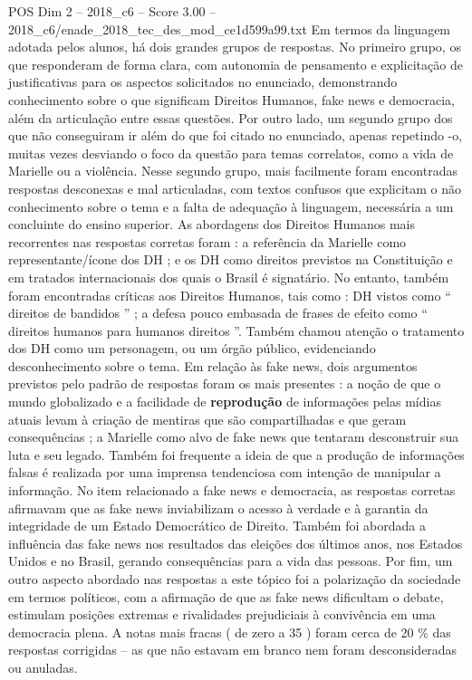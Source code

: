 \begin{textsample}{POS Dim 2 – 2018\_c6 – Score 3.00 – 2018\_c6/enade\_2018\_tec\_des\_mod\_ce1d599a99.txt}
Em termos da linguagem adotada pelos alunos, há dois grandes grupos de respostas.
No primeiro grupo, os que responderam de forma clara, com autonomia de pensamento e explicitação de justificativas para os aspectos solicitados no enunciado, demonstrando conhecimento sobre o que significam Direitos Humanos, fake news e democracia, além da articulação entre essas questões.
Por outro lado, um segundo grupo dos que não conseguiram ir além do que foi citado no enunciado, apenas repetindo -o, muitas vezes desviando o foco da questão para temas correlatos, como a vida de Marielle ou a violência.
Nesse segundo grupo, mais facilmente foram encontradas respostas desconexas e mal articuladas, com textos confusos que explicitam o não conhecimento sobre o tema e a falta de adequação à linguagem, necessária a um concluinte do ensino superior.
As abordagens dos Direitos Humanos mais recorrentes nas respostas corretas foram : a referência da Marielle como representante/ícone dos DH ; e os DH como direitos previstos na Constituição e em tratados internacionais dos quais o Brasil é signatário.
No entanto, também foram encontradas críticas aos Direitos Humanos, tais como : DH vistos como “ direitos de bandidos ” ; a defesa pouco embasada de frases de efeito como “ direitos humanos para humanos direitos ”.
Também chamou atenção o tratamento dos DH como um personagem, ou um órgão público, evidenciando desconhecimento sobre o tema.
Em relação às fake news, dois argumentos previstos pelo padrão de respostas foram os mais presentes : a noção de que o mundo globalizado e a facilidade de \textbf{reprodução} de informações pelas mídias atuais levam à criação de mentiras que são compartilhadas e que geram consequências ; a Marielle como alvo de fake news que tentaram desconstruir sua luta e seu legado.
Também foi frequente a ideia de que a produção de informações falsas é realizada por uma imprensa tendenciosa com intenção de manipular a informação.
No item relacionado a fake news e democracia, as respostas corretas afirmavam que as fake news inviabilizam o acesso à verdade e à garantia da integridade de um Estado Democrático de Direito.
Também foi abordada a influência das fake news nos resultados das eleições dos últimos anos, nos Estados Unidos e no Brasil, gerando consequências para a vida das pessoas.
Por fim, um outro aspecto abordado nas respostas a este tópico foi a polarização da sociedade em termos políticos, com a afirmação de que as fake news dificultam o debate, estimulam posições extremas e rivalidades prejudiciais à convivência em uma democracia plena.
A notas mais fracas ( de zero a 35 ) foram cerca de 20 \% das respostas corrigidas – as que não estavam em branco nem foram desconsideradas ou anuladas.

\end{textsample}

